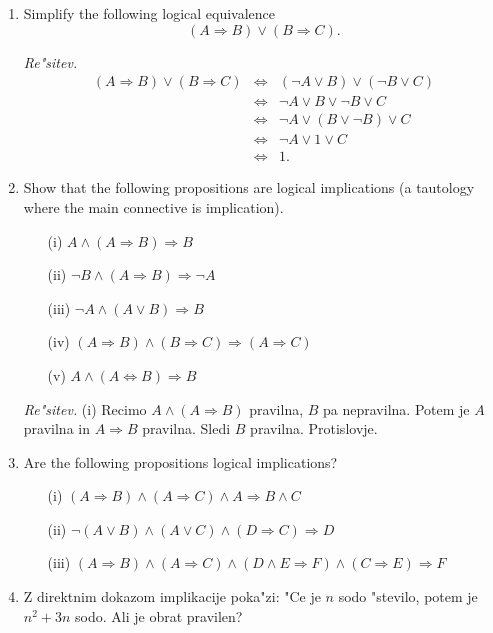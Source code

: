 \documentclass[11pt,paper=b5,footinclude,headinclude]{scrbook} %
\theoremstyle{remark}
\theoremstyle{definition} %
\theoremstyle{theorem} %
\begin{document}
\begin{enumerate}
\item Simplify the following logical equivalence
$$(A\Rightarrow B) \vee (B \Rightarrow C).$$

\emph{Re"sitev.} 
\begin{eqnarray*}
(A\Rightarrow B) \vee (B \Rightarrow C) &\Leftrightarrow & (\neg A \vee B) \vee (\neg B \vee C)\\
&\Leftrightarrow & \neg A \vee B \vee \neg B \vee C\\
&\Leftrightarrow & \neg A \vee (B \vee \neg B) \vee C\\
&\Leftrightarrow & \neg A \vee 1 \vee C\\
&\Leftrightarrow & 1.
\end{eqnarray*}

\item Show that the following propositions are logical implications (a tautology where the main connective is implication).
\begin{enumerate}
\item[(i)] $A \wedge (A \Rightarrow B) \Rightarrow B$
\item[(ii)] $\neg B \wedge (A \Rightarrow B) \Rightarrow \neg A$
\item[(iii)] $\neg A \wedge (A \vee B) \Rightarrow B$
\item[(iv)] $(A \Rightarrow B) \wedge (B \Rightarrow C) \Rightarrow (A \Rightarrow C)$
\item[(v)] $A \wedge (A \Leftrightarrow B) \Rightarrow B$
\end{enumerate}

\emph{Re"sitev.} (i) Recimo $A \wedge (A \Rightarrow B)$ pravilna, $B$ pa nepravilna. Potem je $A$ pravilna in $A\Rightarrow B$ pravilna. Sledi $B$ pravilna. Protislovje. 


\item Are the following propositions logical implications?
\begin{enumerate}
\item[(i)] $(A \Rightarrow B ) \wedge (A \Rightarrow C) \wedge A \Rightarrow B \wedge C$
\item[(ii)] $\neg (A \vee B) \wedge (A\vee C) \wedge (D\Rightarrow C) \Rightarrow D$
\item[(iii)] $(A\Rightarrow B) \wedge (A\Rightarrow C) \wedge (D\wedge E \Rightarrow F) \wedge (C\Rightarrow E) \Rightarrow F$
\end{enumerate}

\item Z direktnim dokazom implikacije poka"zi: "Ce je $n$ sodo "stevilo, potem je $n^2 +3n$ sodo. Ali je obrat pravilen? 


\end{enumerate}
\end{document}
